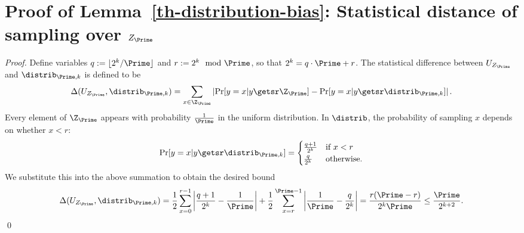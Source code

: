 \section{Proof of Lemma~\ref{th-distribution-bias}: Statistical distance of sampling over $Z_{\Prime}$} \label{apx:sample}

\begin{proof}
	Define variables $q := \lfloor 2^{k}/\Prime \rfloor$ and $r := 2^{k} \mod \Prime$, so that $2^{k} = q\cdot \Prime + r$.
	The statistical difference between $U_{Z_{\Prime}}$ and $\distrib_{\Prime,k}$ is defined to be 
	\[\Delta(U_{Z_{\Prime}}, \distrib_{\Prime,k}) =\sum_{x \in \Z_{\Prime}} \left|\Pr[y = x | y \getsr \Z_{\Prime}] - \Pr[y = x | y \getsr \distrib_{\Prime,k}]\right|.\]
	Every element of $\Z_{\Prime}$ appears with probability $\frac{1}{\Prime}$ in the uniform distribution. In $\distrib$, the probability of sampling $x$ depends on whether $x < r$:
	\[\Pr[y = x | y \getsr \distrib_{\Prime,k}] =  
	\begin{cases}
	\frac{q+1}{2^{k}} & \text{if } x< r \\
	\frac{q}{2^{k}} & \text{otherwise.} \\
	\end{cases}
	\]
	We substitute this into the above summation to obtain the desired bound
	\[\Delta(U_{Z_{\Prime}}, \distrib_{\Prime,k}) =\frac{1}{2}\sum_{x= 0}^{r-1}  \left|\frac{q+1}{2^{k}} - \frac{1}{\Prime}\right| + \frac{1}{2}\sum_{x=r}^{\Prime - 1} \left|\frac{1}{\Prime} - \frac{q}{2^{k}}\right| = \frac{r(\Prime-r)}{2^{k}\Prime} \leq \frac{\Prime}{2^{k+2}}.\] \qed
	
\end{proof}